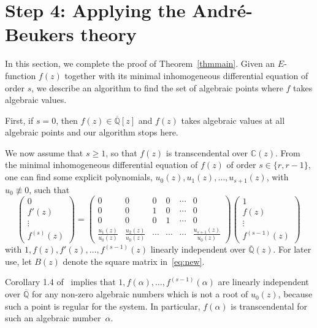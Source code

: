 \documentclass[reqno,english,12pt,a4paper]{smfart}
\numberwithin{equation}{section}
\def\Qbar{\overline{\mathbb Q}}
\begin{document}
\section{Step 4: Applying the Andr\'e-Beukers theory} \label{sec:step4}

In this section, we complete the proof of Theorem~\ref{thmmain}. Given an $E$-function $f(z)$ together with its minimal inhomogeneous differential equation of order $s$, 
we describe an algorithm to find the  set of algebraic points where $f$ takes algebraic 
values. 

First, if $s=0$, then $f(z)\in \Qbar[z]$ and $f(z)$ takes algebraic values at all algebraic points and our algorithm stops here.

We now assume that $s\ge 1$, so that $f(z)$ is transcendental over $\mathbb C(z)$. 
From the minimal inhomogeneous differential equation of $f(z)$ of order $s\in \{r,r-1\}$, one can find some explicit polynomials, 
$u_{0}(z), u_1(z), \ldots, u_{s+1}(z)$, with $u_0\not\equiv 0 $, such that 
\begin{equation}\label{eq:new}
\left(\begin{array}{c}0 \\ f'(z) \\ \vdots \\ f^{(s)}(z) \end{array} \right)
= \left(\begin{array}{cccccc}
 0 & 0 &0& 0& \cdots & 0  
\\
0&0&1&0 &\cdots &0
\\
0&0&0&1 &\cdots &0
\\  
\frac{u_{1}(z)}{u_0(z)} & \frac{u_{2}(z)}{u_0(z)}  &  \cdots &\cdots & \cdots & \frac{u_{s+1}(z)}{u_0(z)}
\end{array} \right)
\left(\begin{array}{c}1 \\ f(z) \\ \vdots \\ f^{(s-1)}(z) \end{array} \right) \,
\end{equation}
with $1,f(z),f'(z),\ldots,f^{(s-1)}(z)$ linearly independent over $\overline{\mathbb Q}(z)$. For later use, let $B(z)$ denote the square matrix in~\eqref{eq:new}.

 Corollary 1.4 of~\cite{beukers} implies that $1,f(\alpha),\ldots,f^{(s-1)}(\alpha)$ 
are linearly independent over $\overline{\mathbb Q}$ for any non-zero algebraic numbers which 
is not a root of $u_0(z)$, because such a point is regular for the system.   
In particular, $f(\alpha)$ is transcendental for such an algebraic number~$\alpha$. 
\end{document}
